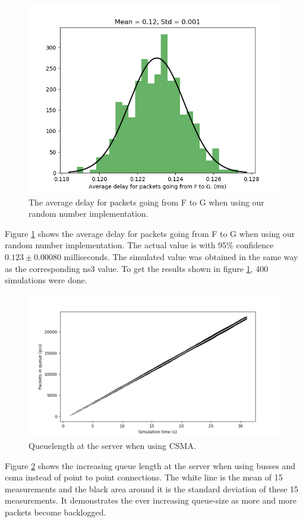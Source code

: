 \documentclass{article}
\begin{document}
\begin{figure}[!htbp]
    \centering
    \includegraphics[width=0.85\linewidth]{our_fg_delay.png}
    \caption{The average delay for packets going from F to G when using our random number implementation.}
    \label{fig:FGOur}
\end{figure}

Figure \ref{fig:FGOur} shows the average delay for packets going from F to G when using our random number implementation.
The actual value is with 95\% confidence $0.123 \pm 0.00080$ milliseconds.
The simulated value was obtained in the same way as the corresponding ns3 value.
To get the results shown in figure \ref{fig:FGOur}, 400 simulations were done.

\begin{figure}[!htbp]
  \includegraphics[width=\linewidth]{queuecsma.png}
  \caption{Queuelength at the server when using CSMA.}
  \label{fig:csmaqueuelen}
\end{figure}
Figure \ref{fig:csmaqueuelen} shows the increasing queue length at the server when using busses and csma instead of point to point connections. The white line is the mean of 15 measurements and the black area around it is the standard deviation of these 15 measurements. It demonstrates the ever increasing queue-size as more and more packets become backlogged.
\end{document}
